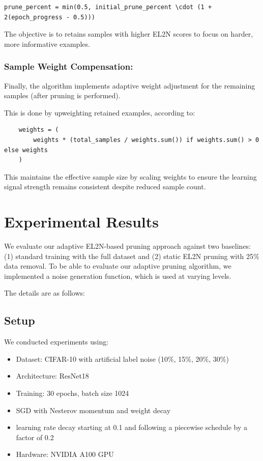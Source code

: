\documentclass{article}
\begin{document}
\begin{verbatim}
prune_percent = min(0.5, initial_prune_percent \cdot (1 + 2(epoch_progress - 0.5)))
\end{verbatim}

The objective is to retains samples with higher EL2N scores to focus on harder, more informative examples.

\subsubsection{Sample Weight Compensation:}
Finally, the algorithm implements adaptive weight adjustment for the remaining samples (after pruning is performed). 

This is done by upweighting retained examples, according to: 
\begin{verbatim}
    weights = (
        weights * (total_samples / weights.sum()) if weights.sum() > 0 else weights
    )
\end{verbatim}

This maintains the effective sample size by scaling weights to ensure the learning signal strength remains consistent despite reduced sample count.
    
\section{Experimental Results}

We evaluate our adaptive EL2N-based pruning approach against two baselines: (1) standard training with the full dataset and (2) static EL2N pruning with 25\% data removal. To be able to evaluate our adaptive pruning algorithm, we implemented a noise generation function, which is used at varying levels.

The details are as follows:

\subsection{Setup}
We conducted experiments using:
\begin{itemize}
\item Dataset: CIFAR-10 with artificial label noise (10\%, 15\%, 20\%, 30\%)
\item Architecture: ResNet18
\item Training: 30 epochs, batch size 1024
\item SGD with Nesterov momentum and weight decay
\item learning rate decay starting at 0.1 and following a piecewise schedule by a factor of 0.2
\item Hardware: NVIDIA A100 GPU
\end{itemize}
\end{document}
